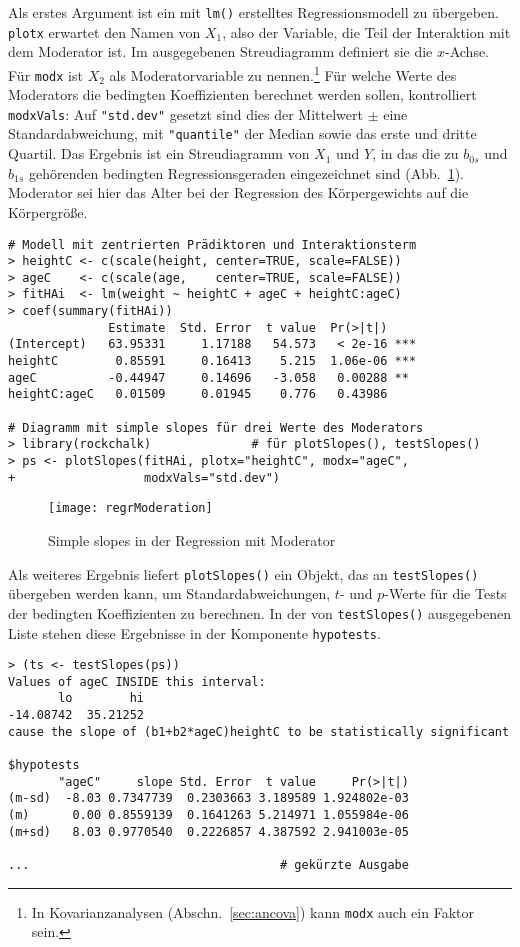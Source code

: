 Als erstes Argument ist ein mit \lstinline!lm()! erstelltes Regressionsmodell zu übergeben. \lstinline!plotx! erwartet den Namen von $X_{1}$, also der Variable, die Teil der Interaktion mit dem Moderator ist. Im ausgegebenen Streudiagramm definiert sie die $x$-Achse. Für \lstinline!modx! ist $X_{2}$ als Moderatorvariable zu nennen.\footnote{In Kovarianzanalysen (Abschn.\ \ref{sec:ancova}) kann \lstinline!modx! auch ein Faktor sein.} Für welche Werte des Moderators die bedingten Koeffizienten berechnet werden sollen, kontrolliert \lstinline!modxVals!: Auf \lstinline!"std.dev"! gesetzt sind dies der Mittelwert $\pm$ eine Standardabweichung, mit \lstinline!"quantile"! der Median sowie das erste und dritte Quartil. Das Ergebnis ist ein Streudiagramm von $X_{1}$ und $Y$, in das die zu $b_{0s}$ und $b_{1s}$ gehörenden bedingten Regressionsgeraden eingezeichnet sind (Abb.\ \ref{fig:regrModeration}). Moderator sei hier das Alter bei der Regression des Körpergewichts auf die Körpergröße.
\begin{lstlisting}
# Modell mit zentrierten Prädiktoren und Interaktionsterm
> heightC <- c(scale(height, center=TRUE, scale=FALSE))
> ageC    <- c(scale(age,    center=TRUE, scale=FALSE))
> fitHAi  <- lm(weight ~ heightC + ageC + heightC:ageC)
> coef(summary(fitHAi))
              Estimate  Std. Error  t value  Pr(>|t|)
(Intercept)   63.95331     1.17188   54.573   < 2e-16 ***
heightC        0.85591     0.16413    5.215  1.06e-06 ***
ageC          -0.44947     0.14696   -3.058   0.00288 **
heightC:ageC   0.01509     0.01945    0.776   0.43986

# Diagramm mit simple slopes für drei Werte des Moderators
> library(rockchalk)              # für plotSlopes(), testSlopes()
> ps <- plotSlopes(fitHAi, plotx="heightC", modx="ageC",
+                  modxVals="std.dev")
\end{lstlisting}

\begin{figure}[ht]
\centering
\texttt{[image: regrModeration]}
\vspace*{-0.5em}
\caption{Simple slopes in der Regression mit Moderator}
\label{fig:regrModeration}
\end{figure}

Als weiteres Ergebnis liefert \lstinline!plotSlopes()! ein Objekt, das an \lstinline!testSlopes()! übergeben werden kann, um Standardabweichungen, $t$- und $p$-Werte für die Tests der bedingten Koeffizienten zu berechnen. In der von \lstinline!testSlopes()! ausgegebenen Liste stehen diese Ergebnisse in der Komponente \lstinline!hypotests!.
\begin{lstlisting}
> (ts <- testSlopes(ps))
Values of ageC INSIDE this interval:
       lo        hi
-14.08742  35.21252
cause the slope of (b1+b2*ageC)heightC to be statistically significant

$hypotests
       "ageC"     slope Std. Error  t value     Pr(>|t|)
(m-sd)  -8.03 0.7347739  0.2303663 3.189589 1.924802e-03
(m)      0.00 0.8559139  0.1641263 5.214971 1.055984e-06
(m+sd)   8.03 0.9770540  0.2226857 4.387592 2.941003e-05

...                                   # gekürzte Ausgabe
\end{lstlisting}

